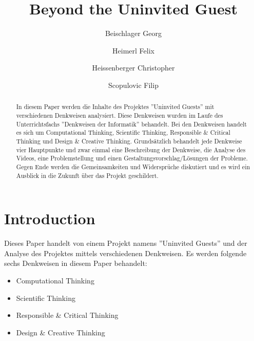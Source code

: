 \documentclass[sigchi-a, authorversion]{acmart}
\begin{document}
\title{Beyond the Uninvited Guest}

\renewcommand{\shortauthors}{F. Author et al.}
\author{Beischlager Georg}

\author{Heimerl Felix}

\author{Heissenberger Christopher}

\author{Scopulovic Filip}
\maketitle

\begin{abstract}
	In diesem Paper werden die Inhalte des Projektes ''Uninvited Guests''\cite{uninvatedGuests} mit verschiedenen Denkweisen analysiert. Diese Denkweisen wurden im Laufe des Unterrichtsfachs ''Denkweisen der Informatik'' behandelt. Bei den Denkweisen handelt es sich um Computational Thinking, Scientific Thinking, Responsible \& Critical Thinking und Design \& Creative Thinking. Grundsätzlich behandelt jede Denkweise vier Hauptpunkte und zwar einmal eine Beschreibung der Denkweise, die Analyse des Videos, eine Problemstellung und einen Gestaltungsvorschlag/Lösungen der Probleme. Gegen Ende werden die Gemeinsamkeiten und Widersprüche diskutiert und es wird ein Ausblick in die Zukunft über das Projekt geschildert.
\end{abstract}

\section{Introduction}

Dieses Paper handelt von einem Projekt namens ''Uninvited Guests''\cite{uninvatedGuests} und der Analyse des Projektes mittels verschiedenen Denkweisen. Es werden folgende sechs Denkweisen in diesem Paper behandelt:
\begin{itemize}
	\item Computational Thinking
	\item Scientific Thinking
	\item Responsible \& Critical Thinking
	\item Design \& Creative Thinking
\end{itemize}
\end{document}
